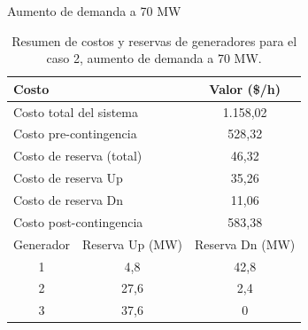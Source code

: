 \begin{frame}{Aumento de demanda a 70 MW}
\small
\begin{table}[H]
	\renewcommand{\arraystretch}{1.3}
	\centering
	\caption{Resumen de costos y reservas de generadores para el caso 2, aumento de demanda a 70 MW.}
	\label{tab: }
	\begin{tabular}{|c|c|c|}
		\hline
		\multicolumn{2}{|l|}{Costo} & Valor (\$/h) \\
		\hline
		\multicolumn{2}{|l|}{Costo total del sistema} & 1.158,02 \\
		\multicolumn{2}{|l|}{Costo pre-contingencia} & 528,32 \\
		\multicolumn{2}{|l|}{Costo de reserva (total)} & 46,32 \\
		\multicolumn{2}{|l|}{Costo de reserva Up} & 35,26 \\
		\multicolumn{2}{|l|}{Costo de reserva Dn} & 11,06 \\
		\multicolumn{2}{|l|}{Costo post-contingencia} & 583,38 \\
		\hline \hline
		Generador & Reserva Up (MW) & Reserva Dn (MW) \\
		\hline
		1 & 4,8 & 42,8 \\
		2 & 27,6 & 2,4 \\
		3 & 37,6 & 0 \\
		\hline
	\end{tabular}
\end{table}

\end{frame}
